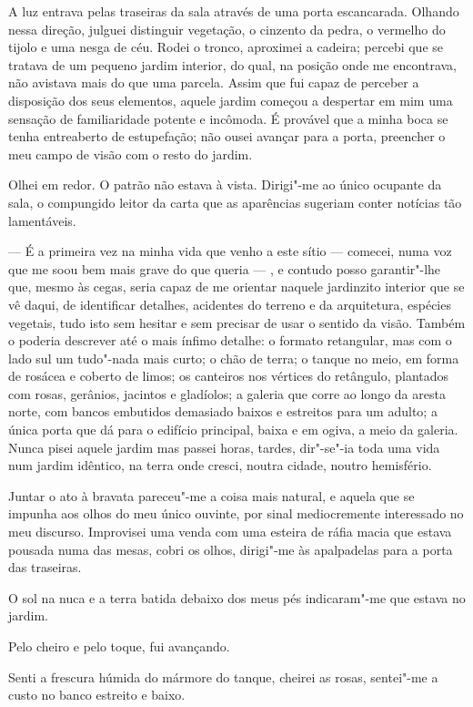 A luz entrava pelas traseiras da sala através de uma porta escancarada.
Olhando nessa direção, julguei distinguir vegetação, o cinzento da
pedra, o vermelho do tijolo e uma nesga de céu. Rodei o tronco,
aproximei a cadeira; percebi que se tratava de um pequeno jardim
interior, do qual, na posição onde me encontrava, não avistava mais do
que uma parcela. Assim que fui capaz de perceber a disposição dos seus
elementos, aquele jardim começou a despertar em mim uma sensação de
familiaridade potente e incômoda. É provável que a minha boca se tenha
entreaberto de estupefação; não ousei avançar para a porta, preencher o
meu campo de visão com o resto do jardim.

Olhei em redor. O patrão não estava à vista. Dirigi"-me ao único ocupante
da sala, o compungido leitor da carta que as aparências sugeriam conter
notícias tão lamentáveis.

--- É a primeira vez na minha vida que venho a este sítio
--- comecei, numa voz que me soou bem mais grave do que queria --- , e
  contudo posso garantir"-lhe que, mesmo às cegas, seria capaz de me
  orientar naquele jardinzito interior que se vê daqui, de identificar
  detalhes, acidentes do terreno e da arquitetura, espécies vegetais,
  tudo isto sem hesitar e sem precisar de usar o sentido da visão.
  Também o poderia descrever até o mais ínfimo detalhe: o formato
  retangular, mas com o lado sul um tudo"-nada mais curto; o
  chão de terra; o tanque no meio, em forma
de rosácea e coberto de limos; os canteiros nos vértices do retângulo,
plantados com rosas, gerânios, jacintos e gladíolos; a galeria que corre
ao longo da aresta norte, com bancos embutidos demasiado baixos e
estreitos para um adulto; a única porta que dá para o edifício
principal, baixa e em ogiva, a meio da galeria. Nunca pisei aquele
jardim mas passei horas, tardes, dir"-se"-ia toda uma vida num jardim
idêntico, na terra onde cresci, noutra cidade, noutro hemisfério.

Juntar o ato à bravata pareceu"-me a coisa mais natural, e aquela que se
impunha aos olhos do meu único ouvinte, por sinal mediocremente
interessado no meu discurso. Improvisei uma venda com uma esteira de
ráfia macia que estava pousada numa das mesas, cobri os olhos, dirigi"-me
às apalpadelas para a porta das traseiras.

O sol na nuca e a terra batida debaixo dos meus pés indicaram"-me que
estava no jardim.

Pelo cheiro e pelo toque, fui avançando.

Senti a frescura húmida do mármore do tanque, cheirei as rosas,
sentei"-me a custo no banco estreito e baixo.

